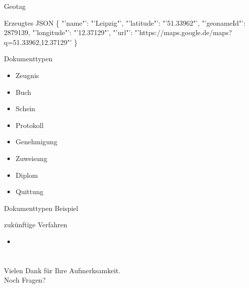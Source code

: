 \documentclass[12pt]{beamer}
\begin{document}
\begin{large}
\begin{frame}{Geotag}
 \vspace*{\fill}
 \begin{block}{Erzeugtes JSON}
 \normalsize \{
 \newline
 \hspace*{0.5cm}"'name"': "'Leipzig"',
 \newline
 \hspace*{0.5cm}"'latitude"': "'51.33962"',
 \newline
 \hspace*{0.5cm}"'geonameId"': 2879139,
 \newline
 \hspace*{0.5cm}"'longitude"': "'12.37129"',
 \newline
 \hspace*{0.5cm}"'url"': "'https://maps.google.de/maps?q=51.33962,12.37129"'
 \newline
 \}
 \end{block}
\end{frame}
 
\begin{frame}{Dokumenttypen}
 \begin{itemize}
  \item Zeugnis
  \item Buch
  \item Schein
  \item Protokoll
  \item Genehmigung
  \item Zuweisung
  \item Diplom
  \item Quittung
 \end{itemize}
\end{frame}

\begin{frame}{Dokumenttypen Beispiel}

\end{frame}


\begin{frame}{zukünftige Verfahren}
 \begin{itemize}
   \item 
 \end{itemize}
\end{frame}


\section*{}
\begin{frame}
\centering
{\Large Vielen Dank für Ihre Aufmerksamkeit. \\ Noch Fragen?}
\end{frame}

\end{large}
\end{document}
